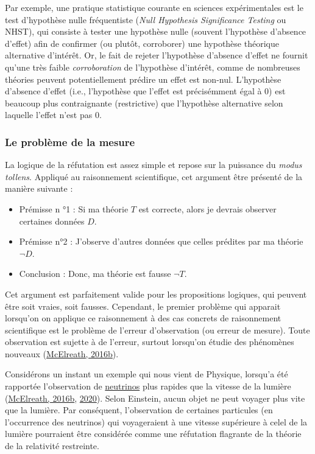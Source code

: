 \documentclass[
  a4paper,11pt,twoside,onecolumn,openright,final,oldfontcommands]{memoir}
\theoremstyle{definition}
\theoremstyle{definition}
\theoremstyle{definition}
\theoremstyle{remark}
\begin{document}
Par exemple, une pratique statistique courante en sciences expérimentales est le test d'hypothèse nulle fréquentiste (\emph{Null Hypothesis Significance Testing} ou NHST), qui consiste à tester une hypothèse nulle (souvent l'hypothèse d'absence d'effet) afin de confirmer (ou plutôt, corroborer) une hypothèse théorique alternative d'intérêt. Or, le fait de rejeter l'hypothèse d'absence d'effet ne fournit qu'une très faible \emph{corroboration} de l'hypothèse d'intérêt, comme de nombreuses théories peuvent potentiellement prédire un effet est non-nul. L'hypothèse d'absence d'effet (i.e., l'hypothèse que l'effet est précisémment égal à \(0\)) est beaucoup plus contraignante (restrictive) que l'hypothèse alternative selon laquelle l'effet n'est pas \(0\).

\hypertarget{le-probluxe8me-de-la-mesure}{%
\subsubsection{Le problème de la mesure}\label{le-probluxe8me-de-la-mesure}}

La logique de la réfutation est assez simple et repose sur la puissance du \emph{modus tollens}. Appliqué au raisonnement scientifique, cet argument être présenté de la manière suivante :

\begin{itemize}
\item
  Prémisse n °1 : Si ma théorie \(T\) est correcte, alors je devrais observer certaines données \(D\).
\item
  Prémisse n°2 : J'observe d'autres données que celles prédites par ma théorie \(\lnot D\).
\item
  Conclusion : Donc, ma théorie est fausse \(\lnot T\).
\end{itemize}

Cet argument est parfaitement valide pour les propositions logiques, qui peuvent être soit vraies, soit fausses. Cependant, le premier problème qui apparait lorsqu'on on applique ce raisonnement à des cas concrets de raisonnement scientifique est le problème de l'erreur d'observation (ou erreur de mesure). Toute observation est sujette à de l'erreur, surtout lorsqu'on étudie des phénomènes nouveaux (\protect\hyperlink{ref-mcelreath_statistical_2016}{McElreath, 2016b}).

Considérons un instant un exemple qui nous vient de Physique, lorsqu'a été rapportée l'observation de \href{https://en.wikipedia.org/wiki/Neutrino}{neutrinos} plus rapides que la vitesse de la lumière (\protect\hyperlink{ref-mcelreath_statistical_2016}{McElreath, 2016b}, \protect\hyperlink{ref-mcelreath_statistical_2020}{2020}). Selon Einstein, aucun objet ne peut voyager plus vite que la lumière. Par conséquent, l'observation de certaines particules (en l'occurrence des neutrinos) qui voyageraient à une vitesse supérieure à celel de la lumière pourraient être considérée comme une réfutation flagrante de la théorie de la relativité restreinte.
\end{document}
